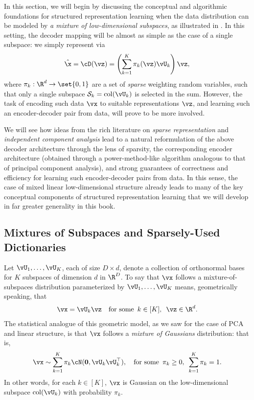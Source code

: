 \documentclass[../../book-main.tex]{subfiles}
\begin{document}
In this section, we will begin by discussing the conceptual and algorithmic
foundations for structured representation learning when the data distribution
can be modeled by {\em a mixture of low-dimensional subspaces}, as
illustrated in . In this setting, the decoder
mapping will be almost as simple as the case of a single subspace: we
simply represent via
\begin{equation}\label{eq:mixture-subspaces-decoder-first-cut}
    \hat{\x} = \cD(\vz) = \left( \sum_{k=1}^K \pi_k(\vz)\vU_k \right) \vz,
\end{equation}
where $\pi_k : \R^d \to \set{0,1}$ are a set of \textit{sparse} weighting random
variables, such that only a single subspace $\mathcal{S}_k
= \mathop{\mathrm{col}}(\vU_k) $ is selected in the sum.
However, the task of encoding such data $\vx$ to suitable
representations $\vz$, and learning such an encoder-decoder pair from
data, will prove to be more involved.

We will see how ideas from the rich literature on \textit{sparse representation}
and \textit{independent component analysis} lead to a natural reformulation of
the above decoder architecture through the lens of sparsity, the corresponding
encoder architecture (obtained through a power-method-like algorithm analogous
to that of principal component analysis), and strong guarantees of correctness
and efficiency for learning such encoder-decoder pairs from data. In this sense,
the case of mixed linear low-dimensional structure already leads to many of the
key conceptual components of structured representation learning that
we will develop in
far greater generality in this book.

\subsection{Mixtures of Subspaces and Sparsely-Used
Dictionaries}\label{sec:mixture-and-dict}

Let $\vU_1, \dots, \vU_K$, each of size $D \times d$, denote a
collection of orthonormal bases for $K$ subspaces of dimension $d$ in $\R^D$.
To say that $\vx$ follows a mixture-of-subspaces distribution
parameterized by $\vU_1, \dots, \vU_K$ means, geometrically speaking,
that
\begin{equation}\label{eq:mixture-of-subspaces-geometric}
    \vx = \vU_k \vz  \quad \text{for some} \enspace k \in
    [K],\enspace \vz \in \R^d.
\end{equation}
The statistical analogue of this geometric model, as we saw for the
case of PCA and linear structure,
is that $\vx$ follows a \textit{mixture of Gaussians} distribution: that is,
\begin{equation}\label{eq:mixture-of-subspaces-statistical}
    \vx \sim \sum_{k=1}^K \pi_k \cN(\mathbf{0}, \vU_k\vU_k^\top),
    \quad \text{for some} \enspace \pi_k \geq 0,\enspace \sum_{k=1}^K \pi_k = 1.
\end{equation}
In other words, for each $k \in [K]$, $\vx$ is Gaussian on the low-dimensional
subspace $\mathop{\mathrm{col}}(\vU_k)$  with probability $\pi_k$.
\end{document}
